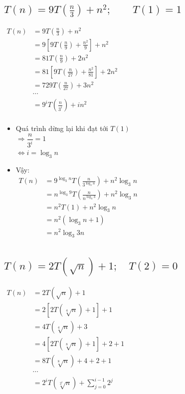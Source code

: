 \documentclass[12pt, letterpaper]{article}
\begin{document}
\subsection{$ T(n) = 9T(\frac{n}{3}) + n^2; \quad \quad T(1) = 1 $}
$ \begin{aligned}
    T(n) &= 9T(\frac{n}{3}) + n^2 \\
        &= 9[9T(\frac{n}{9}) + \frac{n^2}{9}] + n^2 \\
        &= 81T(\frac{n}{9}) + 2n^2 \\
        &= 81[9T(\frac{n}{27}) + \frac{n^2}{81}] + 2n^2 \\
        &= 729 T(\frac{n}{27}) + 3n^2 \\
        &\cdots \\
        &= 9^i T(\frac{n}{3^i}) + in^2 \\
\end{aligned} $

\begin{itemize}[label=-]
    \item Quá trình dừng lại khi đạt tới $ T(1) $ \\
        $ \Rightarrow \dfrac{n}{3^i} = 1 $ \\
        $ \Leftrightarrow i = \log_3n $
    \item Vậy:\\
        $ \begin{aligned}
            T(n) &= 9^{\log_3n} T(\frac{n}{3^{\log_3n}}) + n^2{\log_3n} \\
                &= n^{\log_3 9} T(\frac{n}{n^{\log_3 3}}) + n^2{\log_3n} \\
                &= n^2 T(1) + n^2{\log_3n} \\
                &= n^2 (\log_3 n + 1) \\
                &= n^2 \log_3 3n \\
        \end{aligned} $
\end{itemize}

\subsection{$ T(n) = 2T(\sqrt{n}) + 1; \quad T(2) = 0 $}
$ \begin{aligned}
    T(n) &= 2T(\sqrt{n}) + 1 \\
        &= 2[2T(\sqrt[4]{n}) + 1] + 1 \\
        &= 4T(\sqrt[4]{n}) + 3 \\
        &= 4[2T(\sqrt[8]{n}) + 1] + 2 + 1 \\
        &= 8T(\sqrt[8]{n}) + 4 + 2 + 1 \\
        &\cdots \\
        &= 2^{i}T(\sqrt[2^i]{n}) + \sum_{j = 0}^{i - 1}2^j \\
\end{aligned} $
\end{document}
